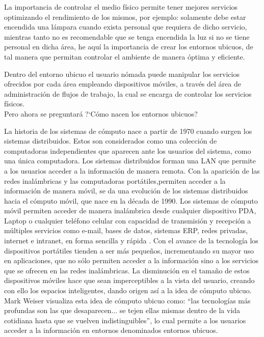 \vspace*{0.2cm}

La importancia de controlar el medio físico permite tener mejores
servicios optimizando el rendimiento de los mismos, por ejemplo:
solamente debe estar encendida una lámpara cuando exista personal
que requiera de dicho servicio, mientras tanto no es recomendable
que se tenga encendida la luz si no se tiene personal en dicha
área, he aquí la importancia de crear los entornos ubicuos, de tal
manera que permitan controlar el ambiente de manera óptima y
eficiente.\\

\vspace{0.2cm}

Dentro del entorno ubicuo el usuario nómada puede manipular los
servicios ofrecidos por cada área empleando dispositivos móviles,
a través del área de administración de flujos de trabajo, la cual
se encarga de controlar los servicios físicos.\\

\vspace{0.2cm} Pero ahora se preguntará ?`Cómo nacen los entornos
ubicuos?\\

\vspace{0.2cm}

La historia de los sistemas de cómputo nace a partir de 1970
cuando surgen los sistemas distribuidos. Estos son considerados
como una colección de computadoras independientes que aparecen
ante los usuarios del sistema, como una única
computadora\cite{Tanenbaum1996}. Los sistemas distribuidos forman
una LAN que permite a los usuarios acceder a la información de
manera remota. Con la aparición de las redes inalámbricas y las
computadoras portátiles,permiten acceder a la información de
manera móvil, se da una evolución de los sistemas distribuidos
hacia el cómputo móvil, que nace en la década de 1990. Los
sistemas de cómputo móvil permiten acceder de manera inalámbrica
desde cualquier dispositivo PDA, Laptop o cualquier teléfono
celular con capacidad de transmisión y recepción a múltiples
servicios como e-mail, bases de datos, sistemas ERP, redes
privadas, internet e intranet, en forma sencilla y rápida
\cite{computomovil}. Con el avance de la tecnología los
dispositivos portátiles tienden a ser más pequeños, incrementando
su mayor uso en aplicaciones, que no sólo permiten acceder a la
información sino a los servicios que se ofrecen en las redes
inalámbricas. La disminución en el tamaño de estos dispositivos
móviles hace que sean imperceptibles a la vista del usuario,
creando con ello los espacios inteligentes, dando origen así a la
idea de cómputo ubicuo. Mark Weiser visualiza esta idea de cómputo
ubicuo como: ``las tecnologías más profundas son las que
desaparecen... se tejen ellas mismas dentro de la vida cotidiana
hasta que se vuelven indistinguibles'', lo cual permite a los
usuarios acceder a la información en entornos denominados entornos
ubicuos.\\
\vspace{0.2cm}

